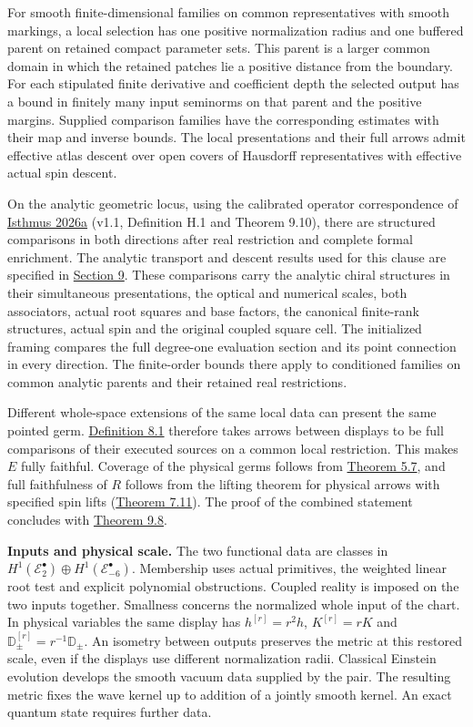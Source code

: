\documentclass[
  english,
  11pt,
  reqno]{amsart}
\begin{document}
For smooth finite-dimensional families on common representatives with
smooth markings, a local selection has one positive normalization radius
and one buffered parent on retained compact parameter sets. This parent
is a larger common domain in which the retained patches lie a positive
distance from the boundary. For each stipulated finite derivative and
coefficient depth the selected output has a bound in finitely many input
seminorms on that parent and the positive margins. Supplied comparison
families have the corresponding estimates with their map and inverse
bounds. The local presentations and their full arrows admit effective
atlas descent over open covers of Hausdorff representatives with
effective actual spin descent.

On the analytic geometric locus, using the calibrated operator
correspondence of \hyperref[ref-IsthmusLocal2026]{Isthmus 2026a} (v1.1,
Definition H.1 and Theorem 9.10), there are structured comparisons in
both directions after real restriction and complete formal enrichment.
The analytic transport and descent results used for this clause are
specified in \hyperref[sec:analytic-wave-comparison]{Section 9}. These
comparisons carry the analytic chiral structures in their simultaneous
presentations, the optical and numerical scales, both associators,
actual root squares and base factors, the canonical finite-rank
structures, actual spin and the original coupled square cell. The
initialized framing compares the full degree-one evaluation section and
its point connection in every direction. The finite-order bounds there
apply to conditioned families on common analytic parents and their
retained real restrictions.

Different whole-space extensions of the same local data can present the
same pointed germ. \hyperref[def:local-display-groupoids]{Definition
8.1} therefore takes arrows between displays to be full comparisons of
their executed sources on a common local restriction. This makes \(E\)
fully faithful. Coverage of the physical germs follows from
\hyperref[thm:submission-vacuum-germ-coverage]{Theorem 5.7}, and full
faithfulness of \(R\) follows from the lifting theorem for physical
arrows with specified spin lifts
(\hyperref[thm:online-full-unmarked-source-hom]{Theorem 7.11}). The
proof of the combined statement concludes with
\hyperref[thm:combined-local-atlas]{Theorem 9.8}.

\textbf{Inputs and physical scale.} The two functional data are classes
in \(H^1(\mathscr E_2^\bullet)\oplus H^1(\mathscr E_{-6}^\bullet)\).
Membership uses actual primitives, the weighted linear root test and
explicit polynomial obstructions. Coupled reality is imposed on the two
inputs together. Smallness concerns the normalized whole input of the
chart. In physical variables the same display has \(h^{[r]}=r^2h\),
\(K^{[r]}=rK\) and \(\mathbb D_\pm^{[r]}=r^{-1}\mathbb D_\pm\). An
isometry between outputs preserves the metric at this restored scale,
even if the displays use different normalization radii. Classical
Einstein evolution develops the smooth vacuum data supplied by the pair.
The resulting metric fixes the wave kernel up to addition of a jointly
smooth kernel. An exact quantum state requires further data.
\end{document}
